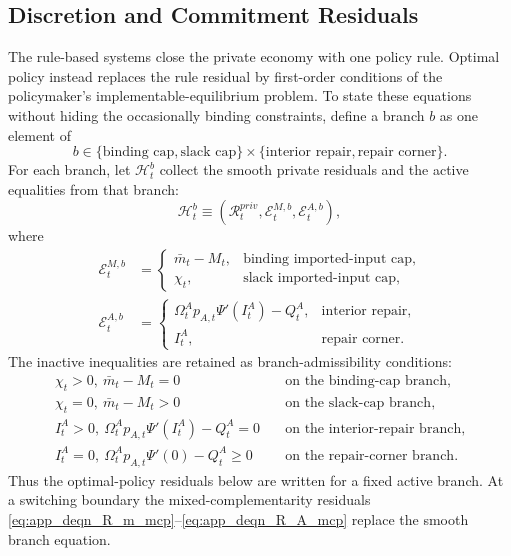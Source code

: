 ﻿\documentclass[12pt]{article}
\theoremstyle{remark}
\begin{document}
\subsection{Discretion and Commitment Residuals}

The rule-based systems close the private economy with one policy rule. Optimal policy instead
replaces the rule residual by first-order conditions of the policymaker's implementable-equilibrium
problem. To state these equations without hiding the occasionally binding constraints, define a
branch $b$ as one element of
\[
    b\in
    \{
    \text{binding cap},\text{slack cap}
    \}
    \times
    \{
    \text{interior repair},\text{repair corner}
    \}.
\]
For each branch, let $\mathcal H_t^b$ collect the smooth private residuals and the active
equalities from that branch:
\begin{equation}
    \mathcal H_t^b
    \equiv
    \left(
        \mathcal R_t^{priv},
        \mathcal E_t^{M,b},
        \mathcal E_t^{A,b}
    \right),
    \label{eq:app_opt_branch_residual}
\end{equation}
where
\begin{align}
    \mathcal E_t^{M,b}
    &=
    \begin{cases}
    \bar m_t-M_t, & \text{binding imported-input cap},\\
    \chi_t, & \text{slack imported-input cap},
    \end{cases}
    \label{eq:app_opt_cap_branch_eq}\\
    \mathcal E_t^{A,b}
    &=
    \begin{cases}
    \Omega_t^Ap_{A,t}\Psi'(I_t^A)-Q_t^A, & \text{interior repair},\\
    I_t^A, & \text{repair corner}.
    \end{cases}
    \label{eq:app_opt_repair_branch_eq}
\end{align}
The inactive inequalities are retained as branch-admissibility conditions:
\begin{align}
    \chi_t>0,\ \bar m_t-M_t=0
    &\quad\text{on the binding-cap branch}, \nonumber\\
    \chi_t=0,\ \bar m_t-M_t>0
    &\quad\text{on the slack-cap branch}, \nonumber\\
    I_t^A>0,\ \Omega_t^Ap_{A,t}\Psi'(I_t^A)-Q_t^A=0
    &\quad\text{on the interior-repair branch}, \nonumber\\
    I_t^A=0,\ \Omega_t^Ap_{A,t}\Psi'(0)-Q_t^A\ge0
    &\quad\text{on the repair-corner branch}.
    \label{eq:app_opt_branch_admissibility}
\end{align}
Thus the optimal-policy residuals below are written for a fixed active branch. At a switching
boundary the mixed-complementarity residuals \eqref{eq:app_deqn_R_m_mcp}--\eqref{eq:app_deqn_R_A_mcp}
replace the smooth branch equation.
\end{document}
